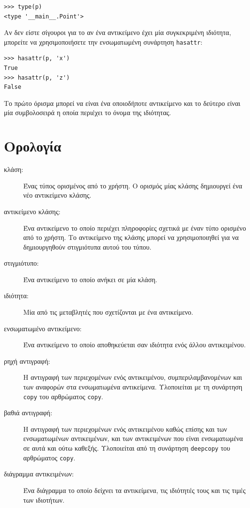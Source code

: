 \documentclass[10pt]{book}
\begin{document}
\begin{verbatim}
>>> type(p)
<type '__main__.Point'>
\end{verbatim}
%
Αν δεν είστε σίγουροι για το αν ένα αντικείμενο έχει μία συγκεκριμένη ιδιότητα,
μπορείτε να χρησιμοποιήσετε την ενσωματωμένη συνάρτηση {\tt hasattr}:

\begin{verbatim}
>>> hasattr(p, 'x')
True
>>> hasattr(p, 'z')
False
\end{verbatim}
%
Το πρώτο όρισμα μπορεί να είναι ένα οποιοδήποτε αντικείμενο και το δεύτερο είναι μία
συμβολοσειρά η οποία περιέχει το όνομα της ιδιότητας.



\section{Ορολογία}

\begin{description}

\item[κλάση:] Ένας τύπος ορισμένος από το χρήστη.  Ο ορισμός μίας κλάσης δημιουργεί ένα νέο  αντικείμενο κλάσης.

\item[αντικείμενο κλάσης:]  Ένα αντικείμενο το οποίο περιέχει πληροφορίες σχετικά με έναν τύπο ορισμένο
από το χρήστη.  Το αντικείμενο της κλάσης μπορεί να χρησιμοποιηθεί για να δημιουργηθούν στιγμιότυπα
αυτού του τύπου.

\item[στιγμιότυπο:] Ένα αντικείμενο το οποίο ανήκει σε μία κλάση.

\item[ιδιότητα:] Μία από τις μεταβλητές που σχετίζονται με ένα αντικείμενο.

\item[ενσωματωμένο αντικείμενο:] Ένα αντικείμενο το οποίο αποθηκεύεται σαν ιδιότητα ενός
άλλου αντικειμένου.

\item[ρηχή αντιγραφή:] Η αντιγραφή των περιεχομένων ενός αντικειμένου, συμπεριλαμβανομένων και των αναφορών στα ενσωματωμένα αντικείμενα. Υλοποιείται με τη συνάρτηση {\tt copy} του αρθρώματος {\tt copy}.

\item[βαθιά αντιγραφή:] Η αντιγραφή των περιεχομένων ενός αντικειμένου καθώς επίσης και των 
ενσωματωμένων αντικειμένων, και των αντικειμένων που είναι ενσωματωμένα σε αυτά και ούτω καθεξής.
Υλοποιείται από τη συνάρτηση {\tt deepcopy} του αρθρώματος {\tt copy}. 

\item[διάγραμμα αντικειμένων:] Ένα διάγραμμα το οποίο δείχνει τα αντικείμενα, τις ιδιότητές τους και
τις τιμές των ιδιοτήτων.

\end{description}
\end{document}
